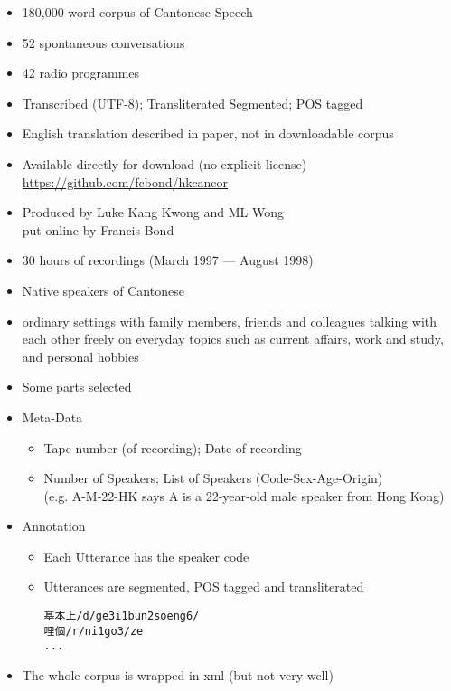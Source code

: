 \documentclass[a4paper,landscape,headrule,footrule,xetex]{foils}
\begin{document}

\makexeCJKactive
{}
\begin{itemize}
\item 180,000-word corpus of Cantonese Speech
\item 52 spontaneous conversations
\item 42 radio programmes
\item Transcribed (UTF-8); Transliterated Segmented; POS tagged
\item English translation described in paper, not in downloadable corpus
\item Available directly for download (no explicit license)
\\ \url{https://github.com/fcbond/hkcancor}
\item Produced by Luke Kang Kwong and ML Wong
  \\ put online by Francis Bond
\end{itemize}
\begin{itemize}
\item 30 hours of recordings (March 1997 --- August 1998)
\item Native speakers of Cantonese
\item ordinary settings with family members, friends and colleagues talking with each other freely on everyday topics such as current affairs, work and study, and personal hobbies
\item Some parts selected
\end{itemize}

\begin{itemize}
\item Meta-Data
  \begin{itemize}
  \item Tape number (of recording);  Date of recording
  \item Number of Speakers; List of Speakers (Code-Sex-Age-Origin) \\
(e.g. A-M-22-HK says A is a 22-year-old male speaker from Hong Kong)
  \end{itemize}
\item Annotation
  \begin{itemize}
  \item Each Utterance has the speaker code
  \item Utterances are segmented, POS tagged and transliterated
    \begin{verbatim}
基本上/d/ge3i1bun2soeng6/
哩個/r/ni1go3/ze
...
\end{verbatim}
  \end{itemize}
\item The whole corpus is wrapped in xml (but not very well)
\end{itemize}
\end{document}
